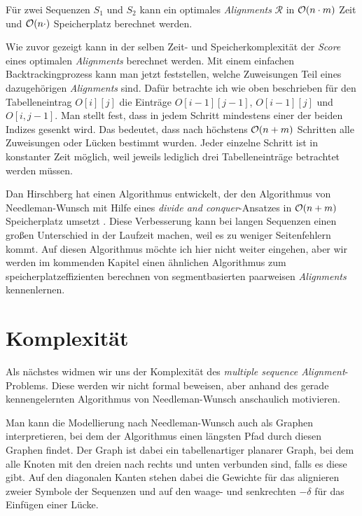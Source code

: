 \begin{korollar}
	Für zwei Sequenzen $S_1$ und $S_2$ kann ein optimales \emph{Alignments} $\mathcal{R}$ in $\mathcal{O}(n\cdot m)$ Zeit und $\mathcal{O}(n\cdot)$ Speicherplatz berechnet werden.
\end{korollar}

\begin{beweis}
	Wie zuvor gezeigt kann in der selben Zeit- und Speicherkomplexität der \emph{Score} eines optimalen \emph{Alignments} berechnet werden. Mit einem einfachen Backtrackingprozess kann man jetzt feststellen, welche Zuweisungen Teil eines dazugehörigen \emph{Alignments} sind. Dafür betrachte ich wie oben beschrieben für den Tabelleneintrag $O[i][j]$ die Einträge  $O[i-1][j-1]$, $O[i-1][j]$ und $O[i,j-1]$. Man stellt fest, dass in jedem Schritt mindestens einer der beiden Indizes gesenkt wird. Das bedeutet, dass nach höchstens $\mathcal{O}(n+m)$ Schritten alle Zuweisungen oder Lücken bestimmt wurden. Jeder einzelne Schritt ist in konstanter Zeit möglich, weil jeweils lediglich drei Tabelleneinträge betrachtet werden müssen. 
\end{beweis}

Dan Hirschberg hat einen Algorithmus entwickelt, der den Algorithmus von Needleman-Wunsch mit Hilfe eines \emph{divide and conquer}-Ansatzes in $\mathcal{O}(n+m)$ Speicherplatz umsetzt \citep{h75}. Diese Verbesserung kann bei langen Sequenzen einen großen Unterschied in der Laufzeit machen, weil es zu weniger Seitenfehlern kommt. Auf diesen Algorithmus möchte ich hier nicht weiter eingehen, aber wir werden im kommenden Kapitel einen ähnlichen Algorithmus zum speicherplatzeffizienten berechnen von segmentbasierten paarweisen \emph{Alignments} kennenlernen.

\section{Komplexität}

Als nächstes widmen wir uns der Komplexität des \emph{multiple sequence Alignment}-Problems. Diese werden wir nicht formal beweisen, aber anhand des gerade kennengelernten Algorithmus von Needleman-Wunsch anschaulich motivieren.

Man kann die Modellierung nach Needleman-Wunsch auch als Graphen interpretieren, bei dem der Algorithmus einen längsten Pfad durch diesen Graphen findet. Der Graph ist dabei ein tabellenartiger planarer Graph, bei dem alle Knoten mit den dreien nach rechts und unten verbunden sind, falls es diese gibt. Auf den diagonalen Kanten stehen dabei die Gewichte für das alignieren zweier Symbole der Sequenzen und auf den waage- und senkrechten $-\delta$ für das Einfügen einer Lücke.

